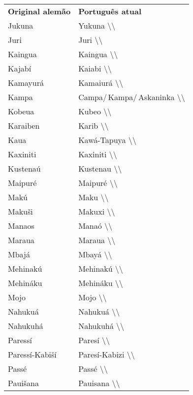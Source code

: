 \begin{table}[]
\begin{tabular}{|l|l|}
\textbf{Original alemão} & \textbf{Português atual}\\
Jukuna                   & Yukuna \textbackslash{}\textbackslash{}\\
Juri                     & Juri \textbackslash{}\textbackslash{}\\
Kaingua                  & Kaingua \textbackslash{}\textbackslash{}\\
Kajabí                   & Kaiabi \textbackslash{}\textbackslash{}\\
Kamayurá                 & Kamaiurá \textbackslash{}\textbackslash{}\\
Kampa                    & Campa/\,Kampa/\,Askaninka \textbackslash{}\textbackslash\\
Kobeua                   & Kubeo \textbackslash{}\textbackslash{}\\
Karaiben                 & Karib \textbackslash{}\textbackslash{}\\
Kaua                     & Kawá-Tapuya \textbackslash{}\textbackslash{}\\
Kaxiniti                 & Kaxiniti \textbackslash{}\textbackslash{}\\
Kustenaú                 & Kustenau \textbackslash{}\textbackslash{}\\
Maipuré                  & Maipuré \textbackslash{}\textbackslash{}\\
Makú                     & Maku \textbackslash{}\textbackslash{}\\
Makuši                   & Makuxi \textbackslash{}\textbackslash{}\\
Manaos                   & Manaó \textbackslash{}\textbackslash{}\\
Maraua                   & Maraua \textbackslash{}\textbackslash{}\\
Mbajá                    & Mbayá \textbackslash{}\textbackslash{}\\
Mehinakú                 & Mehinakú \textbackslash{}\textbackslash{}\\
Mehináku                 & Mehináku \textbackslash{}\textbackslash{}\\
Mojo                     & Mojo \textbackslash{}\textbackslash{}\\
Nahukuá                  & Nahukuá \textbackslash{}\textbackslash{}\\
Nahukuhá                 & Nahukuhá \textbackslash{}\textbackslash{}\\
Paressí                  & Paresí \textbackslash{}\textbackslash{}\\
Paressí-Kabiší           & Paresí-Kabizi \textbackslash{}\textbackslash{}\\
Passé                    & Passé \textbackslash{}\textbackslash{}\\
Pauišana                 & Pauisana \textbackslash{}\textbackslash{}      
\end{tabular}
\end{table}

